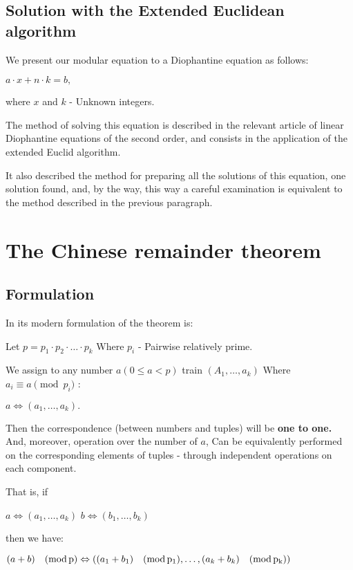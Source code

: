 \subsection{ Solution with the Extended Euclidean algorithm }

We present our modular equation to a Diophantine equation as follows:

$a \cdot x + n \cdot k = b,$

where $x$ and $k$ - Unknown integers.

The method of solving this equation is described in the relevant article of linear Diophantine equations of the second order, and consists in the application of the extended Euclid algorithm.

It also described the method for preparing all the solutions of this equation, one solution found, and, by the way, this way a careful examination is equivalent to the method described in the previous paragraph.

\section{ The Chinese remainder theorem }
\subsection{ Formulation }

In its modern formulation of the theorem is:

Let $p = p_1 \cdot p_2 \cdot \ldots \cdot p_k$ Where $p_i$ - Pairwise relatively prime.

We assign to any number $a$$(0 \le a <p)$ train $(A_1, \ldots, a_k)$ Where $a_i \equiv a \pmod {p_i}$ :

$a \Longleftrightarrow (a_1, \ldots, a_k).$

Then the correspondence (between numbers and tuples) will be \textbf{one to one.} And, moreover, operation over the number of $a$, Can be equivalently performed on the corresponding elements of tuples - through independent operations on each component.

That is, if

$a\Leftrightarrow\left(a_{1},\ldots,a_{k}\right)$
$b\Leftrightarrow\left(b_{1},\ldots,b_{k}\right)$

then we have:

$(a+b)\quad({\rm mod\, p})\Leftrightarrow\left((a_{1}+b_{1})\quad({\rm mod\, p_{1}}),\ldots,(a_{k}+b_{k})\quad({\rm mod\, p_{k}})\right)$

